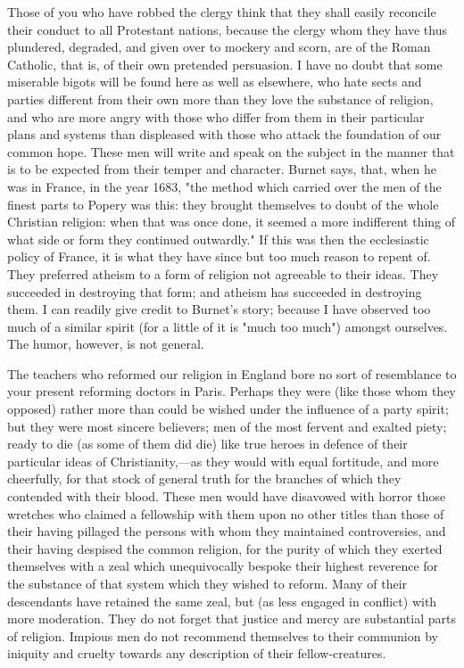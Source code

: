 Those of you who have robbed the clergy think that they shall easily reconcile their conduct to all Protestant nations, because the clergy whom they have thus plundered, degraded, and given over to mockery and scorn, are of the Roman Catholic, that is, of their own pretended persuasion. I have no doubt that some miserable bigots will be found here as well as elsewhere, who hate sects and parties different from their own more than they love the substance of religion, and who are more angry with those who differ from them in their particular plans and systems than displeased with those who attack the foundation of our common hope. These men will write and speak on the subject in the manner that is to be expected from their temper and character. Burnet says, that, when he was in France, in the year 1683, "the method which carried over the men of the finest parts to Popery was this: they brought themselves to doubt of the whole Christian religion: when that was once done, it seemed a more indifferent thing of what side or form they continued outwardly." If this was then the ecclesiastic policy of France, it is what they have since but too much reason to repent of. They preferred atheism to a form of religion not agreeable to their ideas. They succeeded in destroying that form; and atheism has succeeded in destroying them. I can readily give credit to Burnet's story; because I have observed too much of a similar spirit (for a little of it is "much too much") amongst ourselves. The humor, however, is not general.

The teachers who reformed our religion in England bore no sort of resemblance to your present reforming doctors in Paris. Perhaps they were (like those whom they opposed) rather more than could be wished under the influence of a party spirit; but they were most sincere believers; men of the most fervent and exalted piety; ready to die (as some of them did die) like true heroes in defence of their particular ideas of Christianity,—as they would with equal fortitude, and more cheerfully, for that stock of general truth for the branches of which they contended with their blood. These men would have disavowed with horror those wretches who claimed a fellowship with them upon no other titles than those of their having pillaged the persons with whom they maintained controversies, and their having despised the common religion, for the purity of which they exerted themselves with a zeal which unequivocally bespoke their highest reverence for the substance of that system which they wished to reform. Many of their descendants have retained the same zeal, but (as less engaged in conflict) with more moderation. They do not forget that justice and mercy are substantial parts of religion. Impious men do not recommend themselves to their communion by iniquity and cruelty towards any description of their fellow-creatures.

